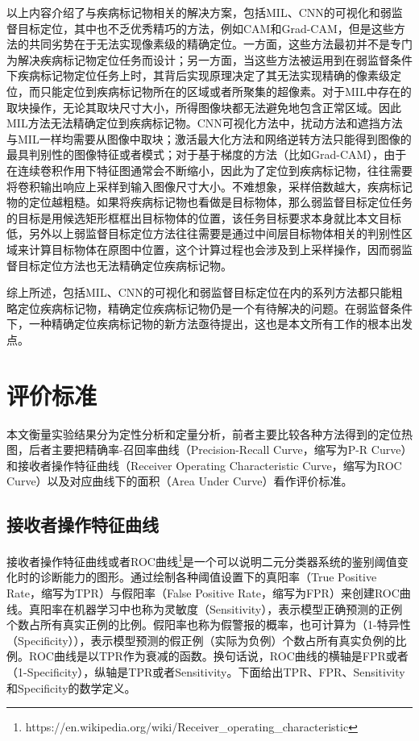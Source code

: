 以上内容介绍了与疾病标记物相关的解决方案，包括MIL、CNN的可视化和弱监督目标定位，其中也不乏优秀精巧的方法，例如CAM和Grad-CAM，但是这些方法的共同劣势在于无法实现像素级的精确定位。一方面，这些方法最初并不是专门为解决疾病标记物定位任务而设计；另一方面，当这些方法被运用到在弱监督条件下疾病标记物定位任务上时，其背后实现原理决定了其无法实现精确的像素级定位，而只能定位到疾病标记物所在的区域或者所聚集的超像素。对于MIL中存在的取块操作，无论其取块尺寸大小，所得图像块都无法避免地包含正常区域。因此MIL方法无法精确定位到疾病标记物。CNN可视化方法中，扰动方法和遮挡方法与MIL一样均需要从图像中取块；激活最大化方法和网络逆转方法只能得到图像的最具判别性的图像特征或者模式；对于基于梯度的方法（比如Grad-CAM），由于在连续卷积作用下特征图通常会不断缩小，因此为了定位到疾病标记物，往往需要将卷积输出响应上采样到输入图像尺寸大小。不难想象，采样倍数越大，疾病标记物的定位越粗糙。如果将疾病标记物也看做是目标物体，那么弱监督目标定位任务的目标是用候选矩形框框出目标物体的位置，该任务目标要求本身就比本文目标低，另外以上弱监督目标定位方法往往需要是通过中间层目标物体相关的判别性区域来计算目标物体在原图中位置，这个计算过程也会涉及到上采样操作，因而弱监督目标定位方法也无法精确定位疾病标记物。

综上所述，包括MIL、CNN的可视化和弱监督目标定位在内的系列方法都只能粗略定位疾病标记物，精确定位疾病标记物仍是一个有待解决的问题。在弱监督条件下，一种精确定位疾病标记物的新方法亟待提出，这也是本文所有工作的根本出发点。
\section{评价标准}\label{sec:evaluation_metrics}
本文衡量实验结果分为定性分析和定量分析，前者主要比较各种方法得到的定位热图，后者主要把精确率-召回率曲线（Precision-Recall Curve，缩写为P-R Curve）和接收者操作特征曲线（Receiver Operating Characteristic Curve，缩写为ROC Curve）以及对应曲线下的面积（Area Under Curve）看作评价标准。
\subsection{接收者操作特征曲线}\label{subsec:roc_curve}
接收者操作特征曲线或者ROC曲线\footnote{https://en.wikipedia.org/wiki/Receiver\_operating\_characteristic}是一个可以说明二元分类器系统的鉴别阈值变化时的诊断能力的图形。通过绘制各种阈值设置下的真阳率（True Positive Rate，缩写为TPR）与假阳率（False Positive Rate，缩写为FPR）来创建ROC曲线。真阳率在机器学习中也称为灵敏度（Sensitivity），表示模型正确预测的正例个数占所有真实正例的比例。假阳率也称为假警报的概率，也可计算为（1-特异性（Specificity）），表示模型预测的假正例（实际为负例）个数占所有真实负例的比例。ROC曲线是以TPR作为衰减的函数。换句话说，ROC曲线的横轴是FPR或者（1-Specificity），纵轴是TPR或者Sensitivity。下面给出TPR、FPR、Sensitivity和Specificity的数学定义。

